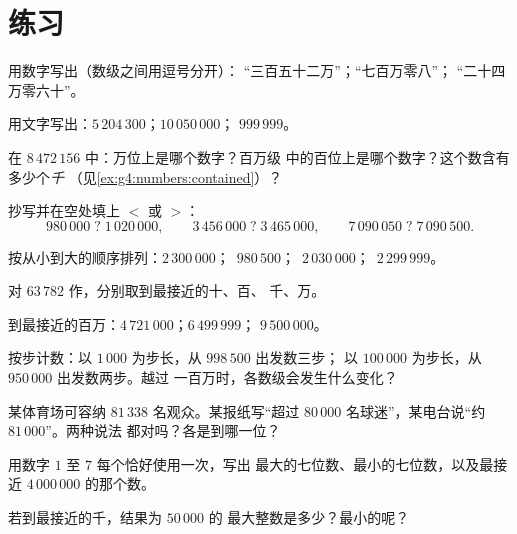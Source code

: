 \section{练习}

\begin{exercise}[$\star$]\label{exo:g4:numbers:1}
用数字写出（数级之间用逗号分开）：
“三百五十二万”；“七百万零八”；
“二十四万零六十”。
\end{exercise}

\begin{exercise}[$\star$]\label{exo:g4:numbers:2}
用文字写出：$5\,204\,300$；\quad $10\,050\,000$；\quad
$999\,999$。
\end{exercise}

\begin{exercise}[$\star$]\label{exo:g4:numbers:3}
在 $8\,472\,156$ 中：万位上是哪个数字？百万级
中的百位上是哪个数字？这个数含有多少个\emph{千}
（见\cref{ex:g4:numbers:contained}）？
\end{exercise}

\begin{exercise}[$\star$]\label{exo:g4:numbers:4}
抄写并在空处填上 $<$ 或 $>$：
\[
980\,000 \;?\; 1\,020\,000, \qquad
3\,456\,000 \;?\; 3\,465\,000, \qquad
7\,090\,050 \;?\; 7\,090\,500 .
\]
\end{exercise}

\begin{exercise}[$\star$]\label{exo:g4:numbers:5}
按从小到大的顺序排列：$2\,300\,000$；\ $980\,500$；\
$2\,030\,000$；\ $2\,299\,999$。
\end{exercise}

\begin{exercise}[$\star$]\label{exo:g4:numbers:6}
对 $63\,782$ 作，分别取到最接近的十、百、
千、万。
\end{exercise}

\begin{exercise}[$\star$]\label{exo:g4:numbers:7}
到最接近的百万：$4\,721\,000$；\quad $6\,499\,999$；
\quad $9\,500\,000$。
\end{exercise}

\begin{exercise}[$\star$]\label{exo:g4:numbers:8}
按步计数：以 $1\,000$ 为步长，从 $998\,500$ 出发数三步；
以 $100\,000$ 为步长，从 $950\,000$ 出发数两步。越过
一百万时，各数级会发生什么变化？
\end{exercise}

\begin{exercise}[$\star$]\label{exo:g4:numbers:9}
某体育场可容纳 $81\,338$ 名观众。某报纸写“超过
$80\,000$ 名球迷”，某电台说“约 $81\,000$”。两种说法
都对吗？各是到哪一位？
\end{exercise}

\begin{exercise}[$\star\star$]\label{exo:g4:numbers:10}
用数字 $1$ 至 $7$ 每个恰好使用一次，写出
最大的七位数、最小的七位数，以及最接近
$4\,000\,000$ 的那个数。
\end{exercise}

\begin{exercise}[$\star\star$]\label{exo:g4:numbers:11}
若到最接近的千，结果为 $50\,000$ 的
最大整数是多少？最小的呢？
\end{exercise}
